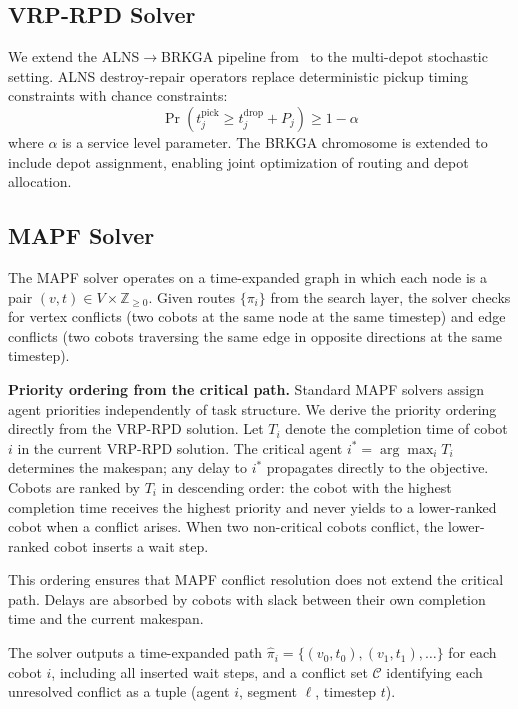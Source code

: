 \documentclass{article}
\begin{document}
\subsection{VRP-RPD Solver}

We extend the ALNS$\to$BRKGA pipeline from~\cite{vrp_rpd_gecco_2026} to the
multi-depot stochastic setting. ALNS destroy-repair operators replace
deterministic pickup timing constraints with chance constraints:
\begin{equation}
    \Pr\left(t_j^{\text{pick}} \geq t_j^{\text{drop}} + P_j\right) \geq 1 - \alpha
\end{equation}
where $\alpha$ is a service level parameter. The BRKGA chromosome is extended
to include depot assignment, enabling joint optimization of routing and depot
allocation.

\subsection{MAPF Solver}

The MAPF solver operates on a time-expanded graph in which each node is a pair
$(v, t) \in V \times \mathbb{Z}_{\geq 0}$. Given routes $\{\pi_i\}$ from the
search layer, the solver checks for vertex conflicts (two cobots at the same
node at the same timestep) and edge conflicts (two cobots traversing the same
edge in opposite directions at the same timestep).

\textbf{Priority ordering from the critical path.} Standard MAPF solvers
assign agent priorities independently of task structure. We derive the priority
ordering directly from the VRP-RPD solution. Let $T_i$ denote the completion
time of cobot $i$ in the current VRP-RPD solution. The critical agent
$i^* = \arg\max_i T_i$ determines the makespan; any delay to $i^*$
propagates directly to the objective. Cobots are ranked by $T_i$ in descending
order: the cobot with the highest completion time receives the highest priority
and never yields to a lower-ranked cobot when a conflict arises. When two
non-critical cobots conflict, the lower-ranked cobot inserts a wait step.

This ordering ensures that MAPF conflict resolution does not extend the critical
path. Delays are absorbed by cobots with slack between their own completion time
and the current makespan.

The solver outputs a time-expanded path $\hat{\pi}_i = \{(v_0, t_0), (v_1,
t_1), \ldots\}$ for each cobot $i$, including all inserted wait steps, and a
conflict set $\mathcal{C}$ identifying each unresolved conflict as a tuple
(agent $i$, segment $\ell$, timestep $t$).
\end{document}
